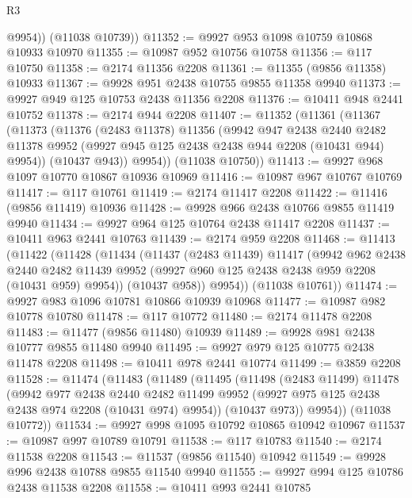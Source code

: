 \begin{lexlean}{R3}
\begin{coremodule}
          @9954))
      (@11038 @10739))
@11352 := @9927 @953 @1098 @10759 @10868 @10933 @10970
@11355 := @10987 @952 @10756 @10758
@11356 := @117 @10750
@11358 := @2174 @11356 @2208
@11361 := @11355 (@9856 @11358) @10933
@11367 := @9928 @951 @2438 @10755 @9855 @11358 @9940
@11373 := @9927 @949 @125 @10753 @2438 @11356 @2208
@11376 := @10411 @948 @2441 @10752
@11378 := @2174 @944 @2208
@11407 := @11352
    (@11361
      (@11367
        (@11373
          (@11376
            (@2483 @11378)
            @11356
            (@9942
              @947
              @2438
              @2440
              @2482
              @11378
              @9952
              (@9927 @945 @125 @2438 @2438 @944 @2208 (@10431 @944) @9954))
            (@10437 @943))
          @9954))
      (@11038 @10750))
@11413 := @9927 @968 @1097 @10770 @10867 @10936 @10969
@11416 := @10987 @967 @10767 @10769
@11417 := @117 @10761
@11419 := @2174 @11417 @2208
@11422 := @11416 (@9856 @11419) @10936
@11428 := @9928 @966 @2438 @10766 @9855 @11419 @9940
@11434 := @9927 @964 @125 @10764 @2438 @11417 @2208
@11437 := @10411 @963 @2441 @10763
@11439 := @2174 @959 @2208
@11468 := @11413
    (@11422
      (@11428
        (@11434
          (@11437
            (@2483 @11439)
            @11417
            (@9942
              @962
              @2438
              @2440
              @2482
              @11439
              @9952
              (@9927 @960 @125 @2438 @2438 @959 @2208 (@10431 @959) @9954))
            (@10437 @958))
          @9954))
      (@11038 @10761))
@11474 := @9927 @983 @1096 @10781 @10866 @10939 @10968
@11477 := @10987 @982 @10778 @10780
@11478 := @117 @10772
@11480 := @2174 @11478 @2208
@11483 := @11477 (@9856 @11480) @10939
@11489 := @9928 @981 @2438 @10777 @9855 @11480 @9940
@11495 := @9927 @979 @125 @10775 @2438 @11478 @2208
@11498 := @10411 @978 @2441 @10774
@11499 := @3859 @2208
@11528 := @11474
    (@11483
      (@11489
        (@11495
          (@11498
            (@2483 @11499)
            @11478
            (@9942
              @977
              @2438
              @2440
              @2482
              @11499
              @9952
              (@9927 @975 @125 @2438 @2438 @974 @2208 (@10431 @974) @9954))
            (@10437 @973))
          @9954))
      (@11038 @10772))
@11534 := @9927 @998 @1095 @10792 @10865 @10942 @10967
@11537 := @10987 @997 @10789 @10791
@11538 := @117 @10783
@11540 := @2174 @11538 @2208
@11543 := @11537 (@9856 @11540) @10942
@11549 := @9928 @996 @2438 @10788 @9855 @11540 @9940
@11555 := @9927 @994 @125 @10786 @2438 @11538 @2208
@11558 := @10411 @993 @2441 @10785

\end{coremodule}
\end{lexlean}
